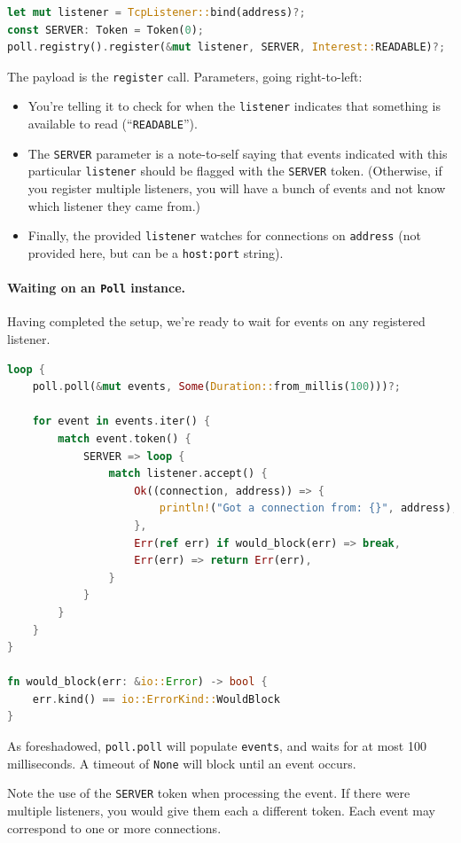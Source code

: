 \documentclass[a4paper]{report}
\begin{document}
\begin{lstlisting}[language=Rust]
let mut listener = TcpListener::bind(address)?;
const SERVER: Token = Token(0);
poll.registry().register(&mut listener, SERVER, Interest::READABLE)?;
\end{lstlisting}

The payload is the \texttt{register} call. Parameters, going right-to-left:
\begin{itemize}[noitemsep]
\item You're telling it to check for 
when the \texttt{listener} indicates that something is available to read
(``\texttt{READABLE}'').
\item The \texttt{SERVER} parameter
is a note-to-self saying that events indicated with this particular
\texttt{listener} should be flagged with the \texttt{SERVER} token.
(Otherwise, if you register multiple listeners, you will have a bunch
of events and not know which listener they came from.)
\item Finally, the provided
\texttt{listener} watches for connections on \texttt{address} (not provided here,
but can be a \texttt{host:port} string).
\end{itemize}

\paragraph{Waiting on an {\tt Poll} instance.} Having completed
the setup, we're ready to wait for events on any registered listener.
    \begin{lstlisting}[language=Rust]
loop {
    poll.poll(&mut events, Some(Duration::from_millis(100)))?;

    for event in events.iter() {
        match event.token() {
            SERVER => loop {
                match listener.accept() {
                    Ok((connection, address)) => {
                        println!("Got a connection from: {}", address);
                    },
                    Err(ref err) if would_block(err) => break,
                    Err(err) => return Err(err),
                }
            }
        }
    }
}

fn would_block(err: &io::Error) -> bool {
    err.kind() == io::ErrorKind::WouldBlock
}    \end{lstlisting}
As foreshadowed, \texttt{poll.poll} will populate \texttt{events}, and
waits for at most 100 milliseconds. A timeout of \texttt{None} will block
until an event occurs.

Note the use of the \texttt{SERVER} token when processing the event.
If there were multiple listeners, you would give them each a different
token. Each event may correspond to one or more connections.
\end{document}
